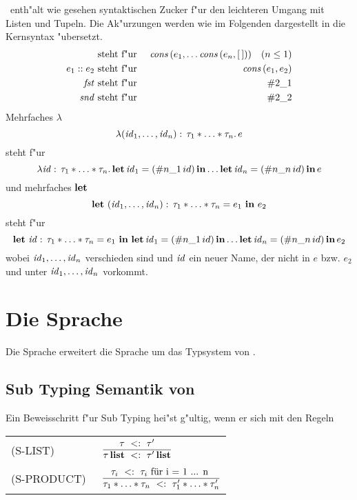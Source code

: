 \LTHREE\ enth"alt wie gesehen syntaktischen Zucker f"ur den leichteren Umgang mit Listen und Tupeln. Die Ak"urzungen werden
wie im Folgenden dargestellt in die Kernsyntax "ubersetzt.
\begin{eqnarray*}
  [e_1;\ldots;e_n]    & \mbox{ steht f"ur } & \Cons\,(e_1,\ldots \Cons\,(e_n, [\,])) \quad (n \le 1) \\
  e_1 \coloncolon e_2 & \mbox{ steht f"ur } & \Cons\,(e_1, e_2) \\
  \Fst                & \mbox{ steht f"ur } & \#2\_1 \\
  \Snd                & \mbox{ steht f"ur } & \#2\_2
\end{eqnarray*}
Mehrfaches $\lambda$
\[
  \lambda({\text{\it id\/}}_1,\ldots,{\text{\it id\/}}_n):\,\tau_1 * \ldots * \tau_n.\,e
\]
steht f"ur
\[
  \lambda {\text{\it id\/}}:\,\tau_1 * \ldots * \tau_n.\,\textbf{let}\,{\text{\it id\/}}_1 = (\#n\_1\,id)\,\textbf{in} \ldots \textbf{let}\,{\text{\it id\/}}_n = (\#n\_n\,id)\,\textbf{in}\,e
\]
und mehrfaches $\textbf{let}$
\[
  \textbf{let}\ ({\text{\it id\/}}_1,\ldots,{\text{\it id\/}}_n):\,\tau_1 * \ldots * \tau_n = e_1\ \textbf{in}\ e_2
\]
steht f"ur
\[
  \textbf{let}\ {\text{\it id\/}}:\,\tau_1 * \ldots * \tau_n = e_1\ \textbf{in}\ \textbf{let}\,{\text{\it id\/}}_1 = (\#n\_1\,id)\,\textbf{in} \ldots \textbf{let}\,{\text{\it id\/}}_n = (\#n\_n\,id)\,\textbf{in}\,e_2
\]
wobei ${\text{\it id\/}}_1,\ldots,{\text{\it id\/}}_n$ verschieden sind und ${\text{\it id\/}}$ ein neuer Name, der nicht in $e$ bzw. $e_2$ und unter ${\text{\it id\/}}_1,\ldots,{\text{\it id\/}}_n$
vorkommt.

\section{Die Sprache \LTHREESUB}
Die Sprache \LTWOSUB erweitert die Sprache \LTWOSUB um das Typsystem von \LTHREE. 

\subsection{Sub Typing Semantik von \LTHREESUB}

Ein Beweisschritt f"ur Sub Typing hei"st g"ultig, wenn er sich mit den Regeln  \\[5mm]
  \begin{tabular}{ll}
    \mbox{(S-LIST)\ }      & $\RULE{\subtype{\tau} {\tau'} }
                              {\subtype{\listtype{\tau}} {\listtype{\tau'}}}$ \\[4mm]
    \mbox{(S-PRODUCT)\ }      & $\RULE{\subtype{\tau_i} {\tau_i} \text{ f\"ur  i = 1 ... n }}
                              {\subtype{\tau_1 * \ldots * \tau_n} {\tau_1' * \ldots * \tau_n'}}$ \\[4mm]
  \end{tabular} \\[7mm]

